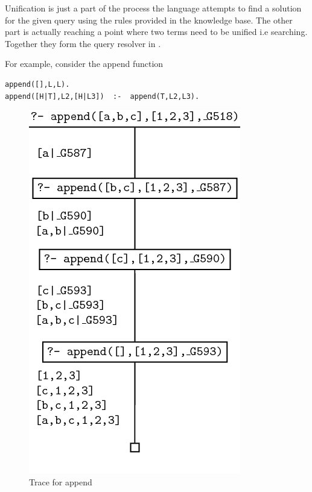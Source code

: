 \documentclass[thesis-solanki.tex]{subfiles}
\begin{document}
Unification is just a part of the process  the language
attempts to find a solution for the given query using the rules provided
in the knowledge base.
The other part is actually reaching a point where two terms need to be
unified i.e searching.
Together they form the query resolver in .

\newpage

For example, consider the append function

\begin{verbatim}
append([],L,L).
append([H|T],L2,[H|L3])  :-  append(T,L2,L3).
\end{verbatim}


\begin{figure}[h]
\centering
\includegraphics[scale = 0.5]{PrologAppendWorking.png}
\caption{Trace for append \cite{webiste:learnprolognowappend}}
\label{fig:Trace for append}
\end{figure}

\end{document}
